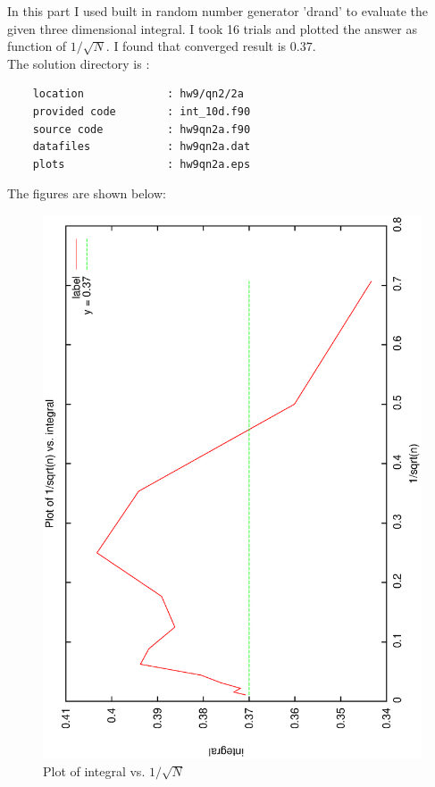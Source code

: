 \documentclass[11pt,a4paper,english]{article}
\begin{document}
	In this part I used built in random number generator 'drand' to evaluate the given three
	dimensional integral. I took 16 trials and plotted the answer as function of $1/\sqrt{N}$.
	I found that converged result is $0.37$.\\
	
			The solution directory is :\\
	\begin{verbatim}
	location             : hw9/qn2/2a
	provided code        : int_10d.f90
	source code          : hw9qn2a.f90
	datafiles            : hw9qn2a.dat
	plots                : hw9qn2a.eps
	\end{verbatim}
	
		    The figures are shown below:\\
	\begin{figure}[h!]
	\centering
	\includegraphics [scale=0.6,angle=270]{figures/hw9qn2a.eps}
	\caption{Plot of integral vs. $1/\sqrt{N}$ }
	\end{figure}
	\clearpage
\end{document}
